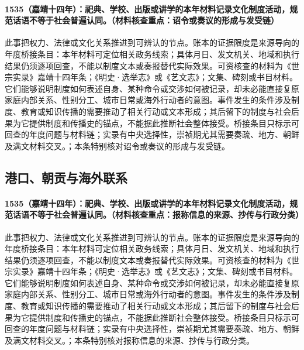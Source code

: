 \paragraph{1535（嘉靖十四年）：祀典、学校、出版或讲学的本年材料记录文化制度活动，规范话语不等于社会普遍认同。（材料核查重点：诏令或奏议的形成与发受链）} 此事把权力、法律或文化关系推进到可辨认的节点。账本的证据限度是来源导向的年度桥接条目：本年材料可定位相关政务线索；具体月日、发文机关、地域和执行结果仍须逐项回查，不能以制度文本或奏报替代实际效果。可资核查的材料为《世宗实录》嘉靖十四年条；《明史·选举志》或《艺文志》；文集、碑刻或书目材料。它们能够说明制度如何表述自身、某种命令或交涉如何被记录，却未必能直接复原家庭内部关系、性别分工、城市日常或海外行动者的意图。事件发生的条件涉及制度、教育或知识传播的需要推动了相关行动或文本形成；其后留下的制度与社会后果为它提供制度和传播史的锚点，不能据此推断社会整体接受。桥接条目只标示可回查的年度问题与材料链；实录有中央选择性，崇祯期尤其需要奏疏、地方、朝鲜及满文材料交叉。；本条特别核对诏令或奏议的形成与发受链。

\subsection{港口、朝贡与海外联系}

\paragraph{1535（嘉靖十四年）：祀典、学校、出版或讲学的本年材料记录文化制度活动，规范话语不等于社会普遍认同。（材料核查重点：报称信息的来源、抄传与行政分类）} 此事把权力、法律或文化关系推进到可辨认的节点。账本的证据限度是来源导向的年度桥接条目：本年材料可定位相关政务线索；具体月日、发文机关、地域和执行结果仍须逐项回查，不能以制度文本或奏报替代实际效果。可资核查的材料为《世宗实录》嘉靖十四年条；《明史·选举志》或《艺文志》；文集、碑刻或书目材料。它们能够说明制度如何表述自身、某种命令或交涉如何被记录，却未必能直接复原家庭内部关系、性别分工、城市日常或海外行动者的意图。事件发生的条件涉及制度、教育或知识传播的需要推动了相关行动或文本形成；其后留下的制度与社会后果为它提供制度和传播史的锚点，不能据此推断社会整体接受。桥接条目只标示可回查的年度问题与材料链；实录有中央选择性，崇祯期尤其需要奏疏、地方、朝鲜及满文材料交叉。；本条特别核对报称信息的来源、抄传与行政分类。

